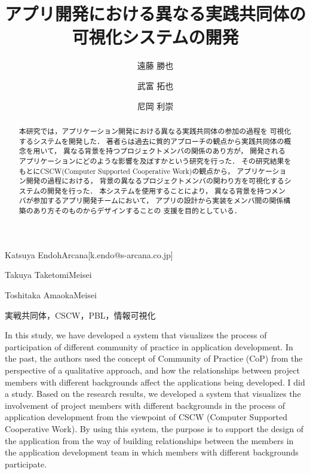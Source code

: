 \documentclass[submit,techrep]{ipsj}
\begin{document}
\title{アプリ開発における異なる実践共同体の\\
可視化システムの開発}




\author{遠藤 勝也}{Katsuya Endoh}{Arcana}[k.endo@s-arcana.co.jp]
\author{武富 拓也}{Takuya Taketomi}{Meisei}
\author{尼岡 利崇}{Toshitaka Amaoka}{Meisei}

\begin{abstract}
本研究では，アプリケーション開発における異なる実践共同体の参加の過程を
可視化するシステムを開発した．
著者らは過去に質的アプローチの観点から実践共同体の概念を用いて，
異なる背景を持つプロジェクトメンバの関係のあり方が，
開発されるアプリケーションにどのような影響を及ぼすかという研究を行った．
その研究結果をもとにCSCW(Computer Supported Cooperative Work)の観点から，
アプリケーション開発の過程における，
背景の異なるプロジェクトメンバの関わり方を可視化するシステムの開発を行った．
本システムを使用することにより，
異なる背景を持つメンバが参加するアプリ開発チームにおいて，
アプリの設計から実装をメンバ間の関係構築のあり方そのものからデザインすることの
支援を目的としている．
\end{abstract}


\begin{jkeyword}
実戦共同体，CSCW，PBL，情報可視化
\end{jkeyword}

\begin{eabstract}
In this study, we have developed a system that visualizes the process of participation of different community of practice in application development.
In the past, the authors used the concept of Community of Practice (CoP) from the perspective of a qualitative approach, and how the relationships between project members with different backgrounds affect the applications being developed. I did a study. Based on the research results, we developed a system that visualizes the involvement of project members with different backgrounds in the process of application development from the viewpoint of CSCW (Computer Supported Cooperative Work). By using this system, the purpose is to support the design of the application from the way of building relationships between the members in the application development team in which members with different backgrounds participate.
\end{eabstract}
\end{document}

